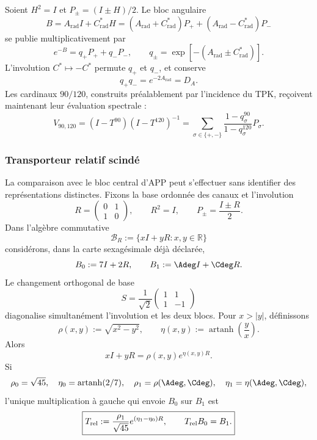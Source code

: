 Soient \(H^2=I\) et \(P_\pm=(I\pm H)/2\). Le bloc angulaire
\begin{equation}
 B=A_{\mathrm{rad}}I+C^*_{\mathrm{rad}}H
 =(A_{\mathrm{rad}}+C^*_{\mathrm{rad}})P_+
 +(A_{\mathrm{rad}}-C^*_{\mathrm{rad}})P_-
 \label{eq:l9s102:b-angular}
\end{equation}
se publie multiplicativement par
\begin{equation}
 e^{-B}=q_+P_++q_-P_-,
 \qquad
 q_\pm=\exp[-(A_{\mathrm{rad}}\pm C^*_{\mathrm{rad}})].
 \label{eq:l9s102:qpm-angular}
\end{equation}
L'involution \(C^*\mapsto-C^*\) permute \(q_+\) et \(q_-\), et conserve
\begin{equation}
 q_+q_-=e^{-2A_{\mathrm{rad}}}=D_A.
 \label{eq:l9s102:det-angular}
\end{equation}
Les cardinaux \(90/120\), construits préalablement par l'incidence du
TPK, reçoivent maintenant leur évaluation spectrale :
\begin{equation}
 V_{90,120}
 =(I-T^{90})(I-T^{120})^{-1}
 =\sum_{\sigma\in\{+,-\}}
 \frac{1-q_\sigma^{90}}{1-q_\sigma^{120}}P_\sigma.
 \label{eq:l9s102:v90120-posterior}
\end{equation}
\subsubsection{Transporteur relatif scindé}
\label{sec:s102:c38:6:3:1}

\label{p3-20260826:sec:transportador-relativo-split}

La comparaison avec le bloc central d'APP peut s'effectuer sans identifier
des représentations distinctes. Fixons la base ordonnée des canaux et
l'involution
\[
 R=\begin{pmatrix}0&1\\1&0\end{pmatrix},
 \qquad R^2=I,
 \qquad
 P_\pm=\frac{I\pm R}{2}.
\]
Dans l'algèbre commutative
\[
 \mathscr B_R:=\{xI+yR:x,y\in\mathbb R\}
\]
considérons, dans la carte sexagésimale déjà déclarée,
\[
 B_0:=7I+2R,
 \qquad
 B_1:=\Adeg I+\Cdeg R.
\]
Le changement orthogonal de base
\[
 S=\frac1{\sqrt2}
 \begin{pmatrix}1&1\\1&-1\end{pmatrix}
\]
diagonalise simultanément l'involution et les deux blocs. Pour \(x>|y|\),
définissons
\[
 \rho(x,y):=\sqrt{x^2-y^2},
 \qquad
 \eta(x,y):=\operatorname{artanh}\!\left(\frac yx\right).
\]
Alors
\[
 xI+yR=\rho(x,y)e^{\eta(x,y)R}.
\]
Si
\[
 \rho_0=\sqrt{45},\quad
 \eta_0=\operatorname{artanh}(2/7),\quad
 \rho_1=\rho(\Adeg,\Cdeg),\quad
 \eta_1=\eta(\Adeg,\Cdeg),
\]
l'unique multiplication à gauche qui envoie \(B_0\) sur \(B_1\) est
\[
 \boxed{
 T_{\rm rel}
 :=\frac{\rho_1}{\sqrt{45}}
 e^{(\eta_1-\eta_0)R},
 \qquad
 T_{\rm rel}B_0=B_1.}
\]

